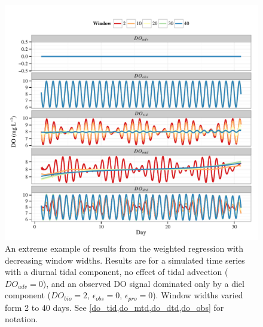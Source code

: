 \documentclass[letterpaper,12pt,oneside]{article}\usepackage[]{graphicx}\usepackage[]{color}
\makeatletter
\def\maxwidth{ %
  \ifdim\Gin@nat@width>\linewidth
    \linewidth
  \else
    \Gin@nat@width
  \fi
}
\newenvironment{knitrout}{}{} %
\makeatother
\begin{document}
\centering\vspace*{\fill}
\begin{knitrout}
\color{fgcolor}\begin{figure}[!ht]


{\centering \includegraphics[width=\maxwidth]{figure/extreme} 

}

\caption[An extreme example of results from the weighted regression with decreasing window widths]{An extreme example of results from the weighted regression with decreasing window widths.  Results are for a simulated time series with a diurnal tidal component, no effect of tidal advection ($DO_{adv} = 0$), and an observed \ac{DO} signal dominated only by a diel component ($DO_{bio} = 2$, $\epsilon_{obs} = 0$, $\epsilon_{pro} = 0$).  Window widths varied form 2 to 40 days.  See \cref{do_tid,do_mtd,do_dtd,do_obs} for notation.\label{fig:extreme}}
\end{figure}


\end{knitrout}
\vfill
\clearpage
\end{document}
